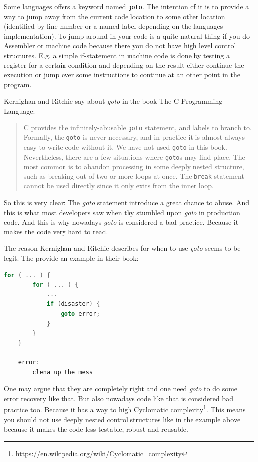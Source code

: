 \documentclass[11pt, a4paper]{report}
\begin{document}
Some languages offers a keyword named \texttt{goto}. The intention of it is to provide a way to jump away from the current code location to some other location (identified by line number or a named label depending on the languages implementation). To jump around in your code is a quite natural thing if you do Assembler or machine code because there you do not have high level control structures. E.g. a simple if-statement in machine code is done by testing a register for a certain condition and depending on the result either continue the execution or jump over some instructions to continue at an other point in the program.

Kernighan and Ritchie say about \textit{goto} in the book The C Programming Language\cite{c-programming-lang}:

\begin{quotation}
    C provides the infinitely-abusable \texttt{goto} statement, and labels to branch to. Formally, the \texttt{goto} is never necessary, and in practice it is almost always easy to write code without it. We have not used \texttt{goto} in this book.
    Nevertheless, there are a few situations where \texttt{goto}s may find place. The most common is to abandon processing in some deeply nested structure, such as breaking out of two or more loops at once. The \texttt{break} statement cannot be used directly since it only exits from the inner loop.
\end{quotation}

So this is very clear: The \textit{goto} statement introduce a great chance to abuse. And this is what most developers saw when thy stumbled upon \textit{goto} in production code. And this is why nowadays \textit{goto} is considered a bad practice. Because it makes the code very hard to read. 

The reason Kernighan and Ritchie describes for when to use \textit{goto} seems to be legit. The provide an example in their book\cite{c-programming-lang}:

\begin{lstlisting}[language=C]
    for ( ... ) {
        for ( ... ) {
            ...
            if (disaster) {
                goto error;
            }
        }
    }
    
    error:
        clena up the mess
\end{lstlisting}

One may argue that they are completely right and one need \textit{goto} to do some error recovery like that. But also nowadays code like that is considered bad practice too. Because it has a way to high Cyclomatic complexity\footnote{\url{https://en.wikipedia.org/wiki/Cyclomatic_complexity}}. This means you should not use deeply nested control structures like in the example above because it makes the code less testable, robust and reusable.
\end{document}
